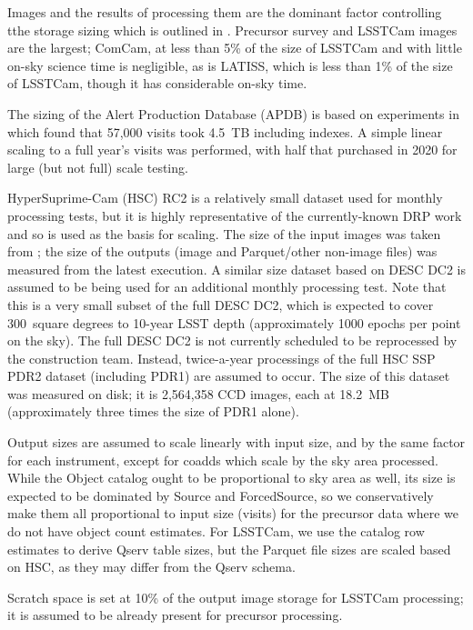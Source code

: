 Images and the results of processing them are the dominant factor controlling tthe storage sizing which is outlined in .
Precursor survey and LSSTCam images are the largest; ComCam, at less than 5\% of the size of LSSTCam and with little on-sky science time is negligible, as is LATISS, which is less than 1\% of the size of LSSTCam, though it has considerable on-sky time.

The sizing of the Alert Production Database (APDB) is based on experiments in \cite{DMTN-113} which found that 57,000 visits took 4.5~TB including indexes.
A simple linear scaling to a full year's visits was performed, with half that purchased in 2020 for large (but not full) scale testing.

HyperSuprime-Cam (HSC) RC2 is a relatively small dataset used for monthly processing tests, but it is highly representative of the currently-known DRP work and so is used as the basis for scaling.
The size of the input images was taken from \cite{DMTN-091}; the size of the outputs (image and Parquet/other non-image files) was measured from the latest execution.
A similar size dataset based on DESC DC2 is assumed to be being used for an additional monthly processing test.
Note that this is a very small subset of the full DESC DC2, which is expected to cover 300~square degrees to 10-year LSST depth (approximately 1000 epochs per point on the sky).
The full DESC DC2 is not currently scheduled to be reprocessed by the construction team.
Instead, twice-a-year processings of the full HSC SSP PDR2 dataset (including PDR1) are assumed to occur.
The size of this dataset was measured on disk; it is 2,564,358 CCD images, each at 18.2~MB (approximately three times the size of PDR1 alone).

Output sizes are assumed to scale linearly with input size, and by the same factor for each instrument, except for coadds which scale by the sky area processed.
While the Object catalog ought to be proportional to sky area as well, its size is expected to be dominated by Source and ForcedSource, so we conservatively make them all proportional to input size (visits) for the precursor data where we do not have object count estimates.  For LSSTCam, we use the catalog row estimates to derive Qserv table sizes, but the Parquet file sizes are scaled based on HSC, as they may differ from the Qserv schema.

Scratch space is set at 10\% of the output image storage for LSSTCam processing; it is assumed to be already present for precursor processing.

